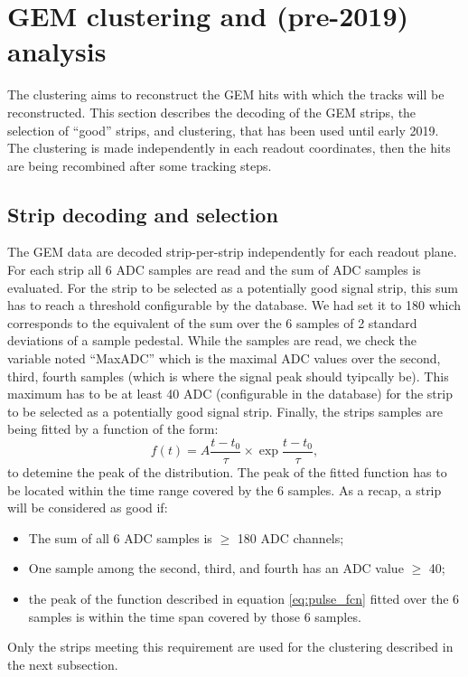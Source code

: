\section{GEM clustering and (pre-2019) analysis}
\label{clustering}

The clustering aims to reconstruct the GEM hits with which the tracks will be reconstructed.
This section describes the decoding of the GEM strips, the selection of ``good'' strips, and clustering, that has been used until early 2019.
The clustering is made independently  in each readout coordinates, then the hits are being recombined after some tracking steps.

\subsection{Strip decoding and selection}
\label{strip_sel}

The GEM data are decoded strip-per-strip independently for each readout plane.
For each strip all 6 ADC samples are read and the sum of ADC samples is evaluated.
For the strip to be selected as a potentially good signal strip, this sum has to reach a threshold configurable by the database.
We had set it to 180 which corresponds to the equivalent of the sum over the 6 samples of 2 standard deviations of a sample pedestal.
While the samples are read, we check the variable noted ``MaxADC'' which is the maximal ADC values over the second, third, fourth samples (which is where the signal peak should tyipcally be). This maximum has to be at least 40 ADC (configurable in the database) for the strip to be selected as a potentially good signal strip.  
Finally, the strips samples are being fitted by a function of the form:
%
\begin{equation}
  f(t) = A \frac{t-t_0}{\tau} \times \exp{\frac{t-t_0}{\tau}},
  \label{eq:pulse_fcn}
\end{equation}
%
to detemine the peak of the distribution. The peak of the fitted function has to be located within the time range covered by the 6 samples.
As a recap, a strip will be considered as good if:
%
\begin{itemize}
\item{The sum of all 6 ADC samples is $\geq$ 180 ADC channels;}
\item{One sample among the second, third, and fourth has an ADC value $\geq$ 40;}
\item{the peak of the function described in equation \ref{eq:pulse_fcn} fitted over the 6 samples is within the time span covered by those 6 samples.}
\end{itemize}
%
Only the strips meeting this requirement are used for the clustering described in the next subsection.

